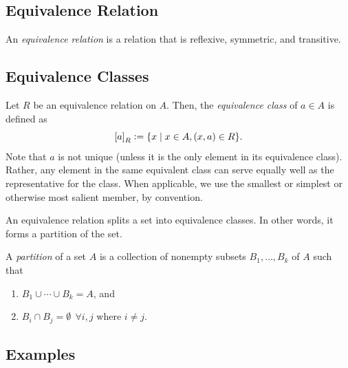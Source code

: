 \documentclass[12pt,letterpaper]{article}
\newcommand{\defeq}{\vcentcolon=}
\begin{document}
    \subsection{Equivalence Relation}
    An \textit{equivalence relation} is a relation that is reflexive, symmetric, and transitive.
    
    \subsection{Equivalence Classes}
    Let $R$ be an equivalence relation on $A$. Then, the \textit{equivalence class} of $a \in A$ is defined as
    \[
    \left[a\right]_R \defeq \{x \mid x\in A, (x,a) \in R\}.
    \]
    Note that $a$ is not unique (unless it is the only element in its equivalence class). Rather, any element in the same equivalent class can serve equally well as the representative for the class. When applicable, we use the smallest or simplest or otherwise most salient member, by convention.
    
    An equivalence relation splits a set into equivalence classes. In other words, it forms a partition of the set.
    
    A \textit{partition} of a set $A$ is a collection of nonempty subsets $B_1, \ldots, B_k$ of $A$ such that
    \begin{enumerate}
    \item $B_1 \cup \cdots \cup B_k = A$, and
    \item $B_i \cap B_j = \emptyset \ \ \forall i,j \text{ where } i \neq j$.
    \end{enumerate}
    
    \subsection{Examples}
    
\end{document}
